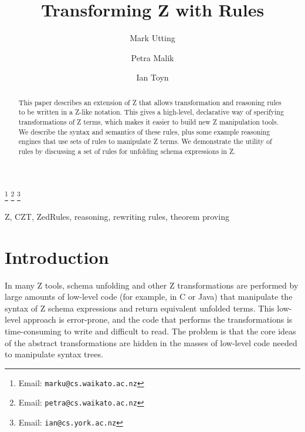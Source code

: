 \documentclass{entcs}
\begin{document}
\begin{frontmatter}
  \title{Transforming Z with Rules}
  \author{Mark Utting}
  \address{Department of Computer Science\\
    The University of Waikato\\
    Hamilton, New Zealand} 
  \author{Petra Malik}
  \address{Department of Computer Science\\
    The University of Waikato\\
    Hamilton, New Zealand} 
  \author{Ian Toyn}
  \address{Department of Computer Science\\
    The University of York\\
    Heslington, York, UK}
  \thanks[emailMark]{Email: \texttt{marku@cs.waikato.ac.nz}}
  \thanks[emailPetra]{Email: \texttt{petra@cs.waikato.ac.nz}}
  \thanks[emailIan]{Email: \texttt{ian@cs.york.ac.nz}}
\begin{abstract}
  This paper describes an extension of Z that allows transformation
  and reasoning rules to be written in a Z-like notation.  This gives
  a high-level, declarative way of specifying transformations of Z
  terms, which makes it easier to build new Z manipulation tools.  We
  describe the syntax and semantics of these rules, plus some example
  reasoning engines that use sets of rules to manipulate Z terms.  We
  demonstrate the utility of rules by discussing a set of rules for
  unfolding schema expressions in Z.
\end{abstract}
\begin{keyword}
  Z, CZT, ZedRules, reasoning, rewriting rules, theorem proving
\end{keyword}
\end{frontmatter}



\section{Introduction}

In many Z tools, schema unfolding and other Z transformations are performed
by large amounts of low-level code (for example, in C or Java) that
manipulate the syntax of Z schema expressions and return equivalent
unfolded terms.  This low-level approach is error-prone, and the code that
performs the transformations is time-consuming to write and difficult to
read.  The problem is that the core ideas of the abstract transformations are
hidden in the masses of low-level code needed to manipulate syntax trees.
\end{document}
